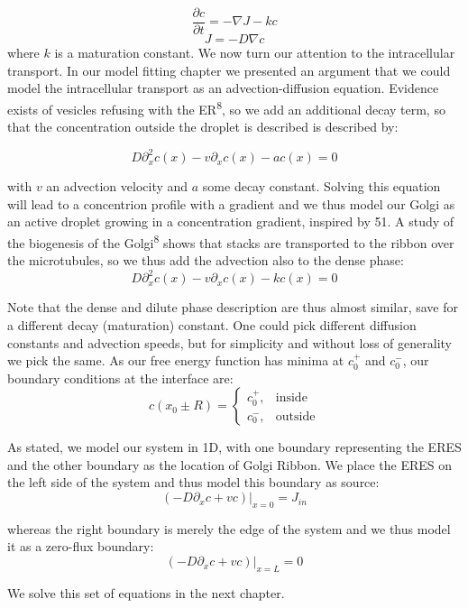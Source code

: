 \documentclass{Dissertate}
\begin{document}
\[
\frac{\partial c}{\partial t} = -\nabla J -kc
\] \[
J = - D \nabla c
\] where \(k\) is a maturation constant. We now turn our attention to
the intracellular transport. In our model fitting chapter we presented
an argument that we could model the intracellular transport as an
advection-diffusion equation. Evidence exists of vesicles refusing with
the ER\textsuperscript{8}, so we add an additional decay term, so that
the concentration outside the droplet is described is described by:

\begin{equation}
D\partial_x^2 c(x) - v\partial_xc(x)-ac(x)=0
\label{eq:cinside}\end{equation}

with \(v\) an advection velocity and \(a\) some decay constant. Solving
this equation will lead to a concentrion profile with a gradient and we
thus model our Golgi as an active droplet growing in a concentration
gradient, inspired by 51. A study of the biogenesis of the
Golgi\textsuperscript{8} shows that stacks are transported to the ribbon
over the microtubules, so we thus add the advection also to the dense
phase: \begin{equation}
D\partial_x^2 c(x) - v\partial_xc(x)-kc(x)=0
\label{eq:coutside}\end{equation}

Note that the dense and dilute phase description are thus almost
similar, save for a different decay (maturation) constant. One could
pick different diffusion constants and advection speeds, but for
simplicity and without loss of generality we pick the same. As our free
energy function has minima at \(c_0^+\) and \(c_0^{-}\), our boundary
conditions at the interface are: \[
c(x_0\pm R)=
\begin{cases}
    c_0^+,& \text{inside}\\
    c_0^-,& \text{outside}
\end{cases}
\]

As stated, we model our system in 1D, with one boundary representing the
ERES and the other boundary as the location of Golgi Ribbon. We place
the ERES on the left side of the system and thus model this boundary as
source: \[
(-D\partial_xc+vc)|_{x=0} = J_{in}
\]

whereas the right boundary is merely the edge of the system and we thus
model it as a zero-flux boundary: \[
(-D\partial_xc+vc)|_{x=L} = 0
\]

We solve this set of equations in the next chapter.
\end{document}
